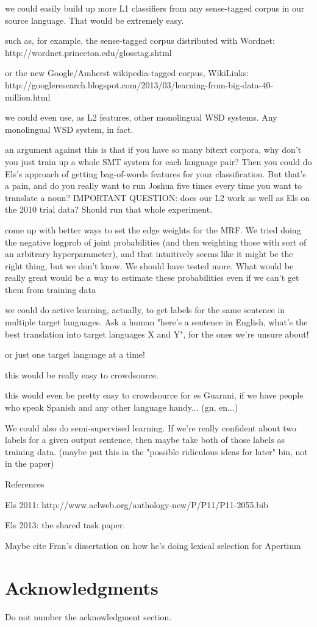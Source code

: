 \documentclass[11pt,letterpaper]{article}
\begin{document}
 we could easily build up more L1 classifiers from any sense-tagged corpus in
our source language. That would be extremely easy.

such as, for example, the sense-tagged corpus distributed with Wordnet:
http://wordnet.princeton.edu/glosstag.shtml


or the new Google/Amherst wikipedia-tagged corpus, WikiLinks:
http://googleresearch.blogspot.com/2013/03/learning-from-big-data-40-million.html


we could even use, as L2 features, other monolingual WSD systems. Any
monolingual WSD system, in fact.


an argument against this is that if you have so many bitext corpora, why
don't you just train up a whole SMT system for each language pair? Then you
could do Els's approach of getting bag-of-words features for your
classification. But that's a pain, and do you really want to run Joshua five
times every time you want to translate a noun? IMPORTANT QUESTION: does our L2
work as well as Els on the 2010 trial data? Should run that whole experiment.


come up with better ways to set the edge weights for the MRF. We tried doing
the negative logprob of joint probabilities (and then weighting those with
sort of an arbitrary hyperparameter), and that intuitively seems like it might
be the right thing, but we don't know. We should have tested more. What would
be really great would be a way to estimate these probabilities even if we
can't get them from training data

we could do active learning, actually, to get labels for the same sentence
in multiple target languages. Ask a human "here's a sentence in English, what's
the best translation into target languages X and Y", for the ones we're unsure
about!

or just one target language at a time!

this would be really easy to crowdsource.

this would even be pretty easy to crowdsource for es Guarani, if we have
people who speak Spanish and any other language handy... (gn, en...)

We could also do semi-supervised learning. If we're really confident about
two labels for a given output sentence, then maybe take both of those labels as
training data. (maybe put this in the "possible ridiculous ideas for later"
bin, not in the paper)


References

Els 2011: http://www.aclweb.org/anthology-new/P/P11/P11-2055.bib

Els 2013: the shared task paper.

Maybe cite Fran's dissertation on how he's doing lexical selection for Apertium

\cite{DBLP:books/daglib/0067131}

\section*{Acknowledgments}

Do not number the acknowledgment section.


{}
\end{document}
